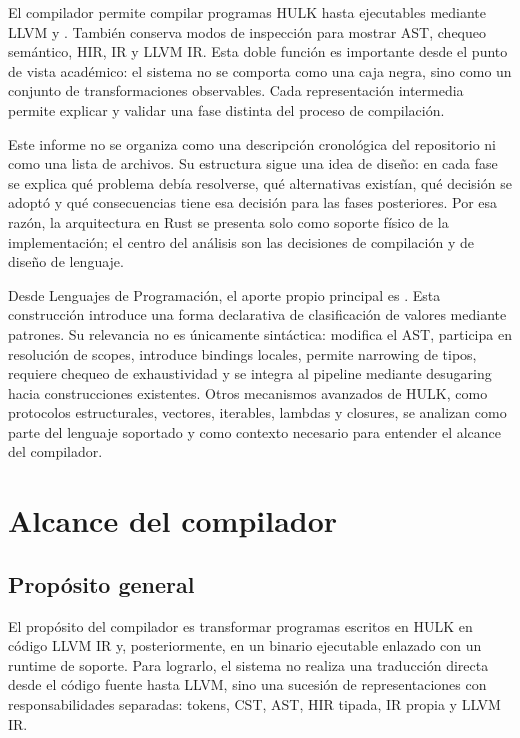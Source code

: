 \documentclass[12pt,letterpaper]{article}
\newcommand{\repo}[1]{\texttt{\detokenize{#1}}}
\newcommand{\hulk}{\textsc{HULK}}
\begin{document}
El compilador permite compilar programas \hulk{} hasta ejecutables mediante LLVM y \repo{clang}. También conserva modos de inspección para mostrar AST, chequeo semántico, HIR, IR y LLVM IR. Esta doble función es importante desde el punto de vista académico: el sistema no se comporta como una caja negra, sino como un conjunto de transformaciones observables. Cada representación intermedia permite explicar y validar una fase distinta del proceso de compilación.

Este informe no se organiza como una descripción cronológica del repositorio ni como una lista de archivos. Su estructura sigue una idea de diseño: en cada fase se explica qué problema debía resolverse, qué alternativas existían, qué decisión se adoptó y qué consecuencias tiene esa decisión para las fases posteriores. Por esa razón, la arquitectura en Rust se presenta solo como soporte físico de la implementación; el centro del análisis son las decisiones de compilación y de diseño de lenguaje.

Desde Lenguajes de Programación, el aporte propio principal es \repo{match}. Esta construcción introduce una forma declarativa de clasificación de valores mediante patrones. Su relevancia no es únicamente sintáctica: modifica el AST, participa en resolución de scopes, introduce bindings locales, permite narrowing de tipos, requiere chequeo de exhaustividad y se integra al pipeline mediante desugaring hacia construcciones existentes. Otros mecanismos avanzados de \hulk{}, como protocolos estructurales, vectores, iterables, lambdas y closures, se analizan como parte del lenguaje soportado y como contexto necesario para entender el alcance del compilador.

\section{Alcance del compilador}

\subsection{Propósito general}

El propósito del compilador es transformar programas escritos en \hulk{} en código LLVM IR y, posteriormente, en un binario ejecutable enlazado con un runtime de soporte. Para lograrlo, el sistema no realiza una traducción directa desde el código fuente hasta LLVM, sino una sucesión de representaciones con responsabilidades separadas: tokens, CST, AST, HIR tipada, IR propia y LLVM IR.
\end{document}
